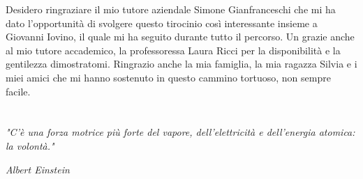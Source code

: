 Desidero ringraziare il mio tutore aziendale Simone Gianfranceschi che mi ha dato l'opportunità di svolgere questo tirocinio così interessante insieme a Giovanni Iovino, il quale mi ha seguito durante tutto il percorso. Un grazie anche al mio tutore accademico, la professoressa Laura Ricci per la disponibilità e la gentilezza dimostratomi. Ringrazio anche la mia famiglia, la mia ragazza Silvia e i miei amici che mi hanno sostenuto in questo cammino tortuoso, non sempre facile. 
\\
\\
\\
\textit{"C’è una forza motrice più forte del vapore, dell’elettricità e dell’energia atomica: la volontà."}
\begin{flushright}
\textit{Albert Einstein}
\end{flushright}